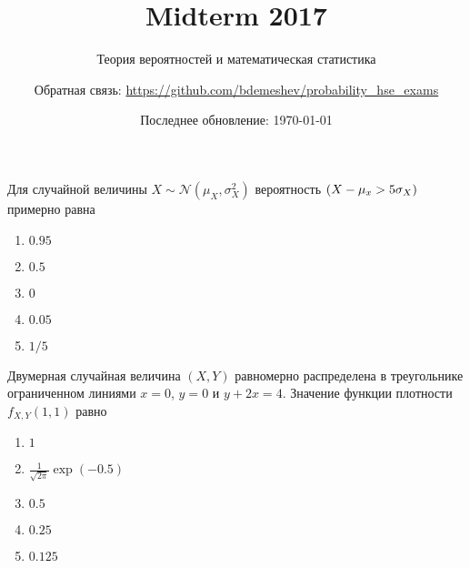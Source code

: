 \documentclass[t]{beamer}
\title{Midterm 2017}
\subtitle{Теория вероятностей и математическая статистика}
\author{Обратная связь: \url{https://github.com/bdemeshev/probability_hse_exams}}
\date{Последнее обновление: \today}
\let\P\relax
\DeclareMathOperator{\P}{\mathbb{P}}
\newcommand{\cN}{\mathcal{N}}
\begin{document}
 

\frame[plain]{\titlepage}

 \begin{frame} \label{1} 
\begin{block}{1} 

  Для случайной величины $X \sim \cN(\mu_X, \sigma^2_X)$ вероятность $\P(X - \mu_x > 5\sigma_X)$  примерно равна
  


 \end{block} 
\begin{enumerate} 
\item[] \hyperlink{1-No}{\beamergotobutton{} $0.95$}
\item[] \hyperlink{1-No}{\beamergotobutton{} $0.5$}
\item[] \hyperlink{1-Yes}{\beamergotobutton{} $0$}
\item[] \hyperlink{1-No}{\beamergotobutton{} $0.05$}
\item[] \hyperlink{1-No}{\beamergotobutton{} $1/5$}
\end{enumerate} 
\end{frame} 


 \begin{frame} \label{2} 
\begin{block}{2} 

Двумерная случайная величина $(X, Y)$ равномерно распределена в треугольнике ограниченном линиями $x=0$, $y=0$ и $y+2x=4$. Значение функции плотности $f_{X,Y}(1,1)$ равно
  


 \end{block} 
\begin{enumerate} 
\item[] \hyperlink{2-No}{\beamergotobutton{} $1$}
\item[] \hyperlink{2-No}{\beamergotobutton{} $\frac{1}{\sqrt{2\pi}}\exp(-0.5)$}
\item[] \hyperlink{2-No}{\beamergotobutton{} $0.5$}
\item[] \hyperlink{2-Yes}{\beamergotobutton{} $0.25$}
\item[] \hyperlink{2-No}{\beamergotobutton{} $0.125$}
\end{enumerate} 
\end{frame} 
\end{document}
